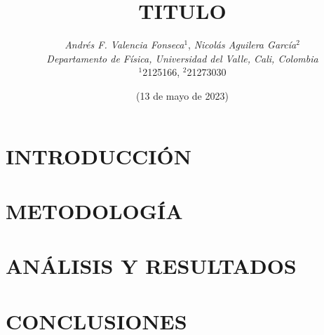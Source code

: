 \documentclass[10pt]{article}
\title{
    \textbf TITULO
}
\author{
    \normalsize{
        \emph{Andrés F. Valencia Fonseca}$^{1}$,
        \emph{Nicolás Aguilera García}$^{2}$
    } \\
    \normalsize{
        \emph{Departamento de Física, Universidad del Valle, Cali, Colombia}
    } \\
    \small{$^{1}$2125166, $^{2}$21273030}
}
\date{(\small 13 de mayo de 2023)}
\begin{document}
\maketitle
\begin{abstract}

\end{abstract}

\begin{multicols*}{2}
    \section{\small INTRODUCCIÓN}
    

    \section{\small METODOLOGÍA}

    \section{\small ANÁLISIS Y RESULTADOS}

    \section{\small CONCLUSIONES}




    \nocite{giancoli}
    \nocite{montiel2015física}

    
    
\end{multicols*}
\end{document}

